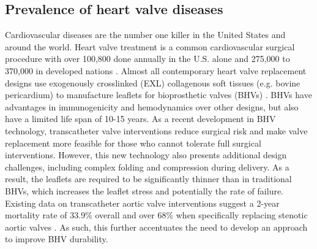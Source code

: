 \subsection{Prevalence of heart valve diseases}
    Cardiovascular diseases are the number one killer in the United States and around the world. 
Heart valve treatment is a common cardiovascular surgical procedure with over 100,800 done annually in the U.S. alone \cite{mozaffarian_heart_2016} and 275,000 to 370,000 in developed nations \cite{manji_future_2012}. Almost all contemporary heart valve replacement designs use exogenously crosslinked (EXL) collagenous soft tissues (e.g. bovine pericardium) to manufacture leaflets for bioprosthetic valves (BHVs) \cite{starr_artificial_2007, soares_biomechanical_2016}. BHVs have advantages in immunogenicity and hemodynamics over other designs, but also have a limited life span of 10-15 years. As a recent development in BHV technology, transcatheter valve interventions \cite{bonow_accaha_2006, guidoin_marvel_2010} reduce surgical risk and make valve replacement more feasible for those who cannot tolerate full surgical interventions. However, this new technology also presents additional design challenges, including complex folding and compression during delivery. As a result, the leaflets are required to be significantly thinner than in traditional BHVs, which increases the leaflet stress and potentially the rate of failure. Existing data on transcatheter aortic valve interventions suggest a 2-year mortality rate of 33.9\% overall \cite{mozaffarian_heart_2016} and over 68\% when specifically replacing stenotic aortic valves \cite{makkar_transcatheter_2012}. As such, this further accentuates the need to develop an approach to improve BHV durability. 

